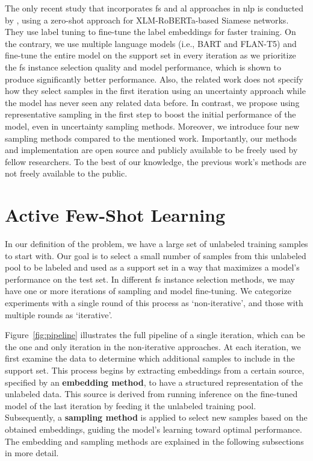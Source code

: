 \documentclass[11pt]{article}
\theoremstyle{definition}
\begin{document}
The only recent study that incorporates \gls*{fs} and \gls*{al} approaches in \gls*{nlp} is conducted by \citet{muller2022active}, using a zero-shot approach for XLM-RoBERTa-based Siamese networks. They use label tuning to fine-tune the label embeddings for faster training.
On the contrary, we use multiple language models (i.e., BART and FLAN-T5) and fine-tune the entire model on the support set in every iteration as we prioritize the \gls*{fs} instance selection quality and model performance, which is shown to produce significantly better performance. Also, the related work does not specify how they select samples in the first iteration using an uncertainty approach while the model has never seen any related data before. In contrast, we propose using representative sampling in the first step to boost the initial performance of the model, even in uncertainty sampling methods. Moreover, we introduce four new sampling methods compared to the mentioned work. Importantly, our methods and implementation are open source and publicly available to be freely used by fellow researchers. To the best of our knowledge, the previous work’s methods are not freely available to the public.


\section{Active Few-Shot Learning} \label{sec:our_approach}

In our definition of the problem, we have a large set of unlabeled training samples to start with. Our goal is to select a small number of samples from this unlabeled pool to be labeled and used as a support set in a way that maximizes a model's performance on the test set.
In different \gls*{fs} instance selection methods, we may have one or more iterations of sampling and model fine-tuning. We categorize experiments with a single round of this process as `non-iterative', and those with multiple rounds as `iterative'.

Figure~\ref{fig:pipeline} illustrates the full pipeline of a single iteration, which can be the one and only iteration in the non-iterative approaches.
At each iteration, we first examine the data to determine which additional samples to include in the support set. This process begins by extracting embeddings from a certain source, specified by an \textbf{embedding method}, to have a structured representation of the unlabeled data. This source is derived from running inference on the fine-tuned model of the last iteration by feeding it the unlabeled training pool. Subsequently, a \textbf{sampling method} is applied to select new samples based on the obtained embeddings, guiding the model's learning toward optimal performance.
The embedding and sampling methods are explained in the following subsections in more detail.
\end{document}
